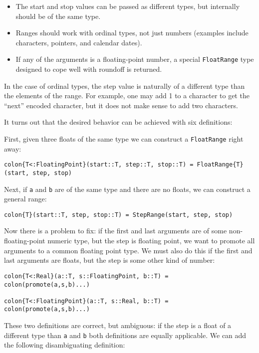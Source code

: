 \begin{itemize}
\item The start and stop values can be passed as different types, but internally
  should be of the same type.
\item Ranges should work with ordinal types, not just numbers (examples include
  characters, pointers, and calendar dates).
\item If any of the arguments is a floating-point number, a special
  \texttt{FloatRange} type designed to cope well with roundoff is returned.
\end{itemize}

In the case of ordinal types, the step value is naturally of a different type
than the elements of the range. For example, one may add 1 to a character to
get the ``next'' encoded character, but it does not make sense to add two
characters.

It turns out that the desired behavior can be achieved with six definitions:

First, given three floats of the same type we can construct a \texttt{FloatRange}
right away:

\begin{verbatim}
colon{T<:FloatingPoint}(start::T, step::T, stop::T) = FloatRange{T}(start, step, stop)
\end{verbatim}

Next, if \texttt{a} and \texttt{b} are of the same type and there are no floats,
we can construct a general range:

\begin{verbatim}
colon{T}(start::T, step, stop::T) = StepRange(start, step, stop)
\end{verbatim}

Now there is a problem to fix: if the first and last arguments are of some
non-floating-point numeric type, but the step is floating point, we want to
promote all arguments to a common floating point type. We must also do this
if the first and last arguments are floats, but the step is some other kind
of number:

\begin{verbatim}
colon{T<:Real}(a::T, s::FloatingPoint, b::T) = colon(promote(a,s,b)...)

colon{T<:FloatingPoint}(a::T, s::Real, b::T) = colon(promote(a,s,b)...)
\end{verbatim}

These two definitions are correct, but ambiguous: if the step is a float
of a different type than \texttt{a} and \texttt{b} both definitions are
equally applicable. We can add the following disambiguating definition:

